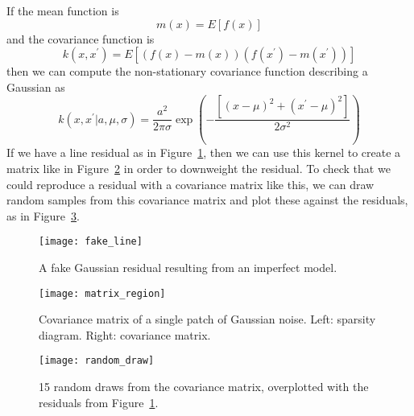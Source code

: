 \documentclass[preprint]{aastex} %
\begin{document}
If the mean function is
\begin{equation}
m(x) = E[f(x)]
\end{equation}
and the covariance function is
\begin{equation}
k(x, x^\prime) = E[(f(x) - m(x))(f(x^\prime) - m(x^\prime))]
\end{equation}
then we can compute the non-stationary covariance function describing a Gaussian as
\begin{equation}
k(x, x^\prime | a, \mu, \sigma) = \frac{a^2}{2 \pi \sigma} \exp \left ( - \frac{[(x - \mu)^2 + (x^\prime - \mu)^2]}{2 \sigma^2}\right )
\end{equation}
If we have a line residual as in Figure~\ref{fig:fake_line}, then we can use this kernel to create a matrix like in Figure~\ref{fig:matrix_region} in order to downweight the residual. To check that we could reproduce a residual with a covariance matrix like this, we can draw random samples from this covariance matrix and plot these against the residuals, as in Figure~\ref{fig:random_draw}.

\begin{figure}[!htb]
\begin{center}
  \texttt{[image: fake\_line]}
\caption{A fake Gaussian residual resulting from an imperfect model.}
\label{fig:fake_line}
\end{center}
\end{figure}

\begin{figure}[!htb]
\begin{center}
\texttt{[image: matrix\_region]}
\caption{Covariance matrix of a single patch of Gaussian noise. Left: sparsity diagram. Right: covariance matrix.}
\label{fig:matrix_region}
\end{center}
\end{figure}

\begin{figure}[!htb]
\begin{center}
\texttt{[image: random\_draw]}
\caption{15 random draws from the covariance matrix, overplotted with the residuals from Figure~\ref{fig:fake_line}.}
\label{fig:random_draw}
\end{center}
\end{figure}
\end{document}
